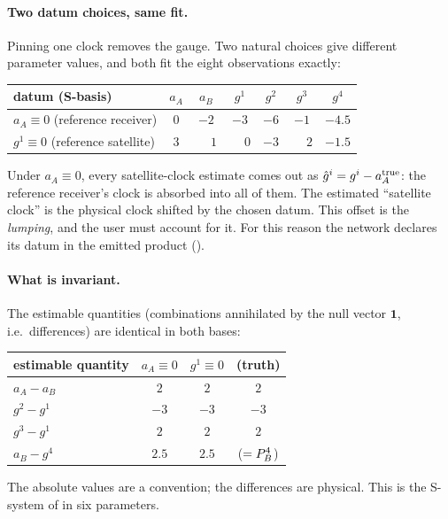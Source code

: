 \documentclass[main.tex]{subfiles}
\begin{document}
\paragraph{Two datum choices, same fit.}
Pinning one clock removes the gauge. Two natural choices give different
parameter values, and both fit the eight observations exactly:
\begin{center}
\begin{tabular}{@{}lcccccc@{}}
\toprule
datum (S-basis) & $a_A$ & $a_B$ & $g^1$ & $g^2$ & $g^3$ & $g^4$ \\
\midrule
$a_A \equiv 0$ (reference receiver) & $0$ & $-2$ & $-3$ & $-6$ & $-1$ & $-4.5$ \\
$g^1 \equiv 0$ (reference satellite) & $3$ & $\phantom{-}1$ & $\phantom{-}0$ & $-3$ & $\phantom{-}2$ & $-1.5$ \\
\bottomrule
\end{tabular}
\end{center}
Under $a_A \equiv 0$, every satellite-clock estimate comes out as
$\hat g^i = g^i - a_A^{\text{true}}$: the reference receiver's
clock is absorbed into all of them. The estimated ``satellite clock'' is
the physical clock shifted by the chosen datum. This offset is the
\emph{lumping}, and the user must account for it. For this reason the
network declares its datum in the emitted product
().

\paragraph{What is invariant.}
The estimable quantities (combinations annihilated by the null vector
$\bm{1}$, i.e.\ differences) are identical in both bases:
\begin{center}
\begin{tabular}{@{}lccc@{}}
\toprule
estimable quantity & $a_A \equiv 0$ & $g^1 \equiv 0$ & (truth) \\
\midrule
$a_A - a_B$  & $2$  & $2$  & $2$ \\
$g^2 - g^1$  & $-3$ & $-3$ & $-3$ \\
$g^3 - g^1$  & $2$  & $2$  & $2$ \\
$a_B - g^4$  & $2.5$ & $2.5$ & ($=P^4_B$) \\
\bottomrule
\end{tabular}
\end{center}
The absolute values are a convention; the differences are physical.
This is the S-system of \cite{teunissen1985generalised} in six
parameters.
\end{document}
